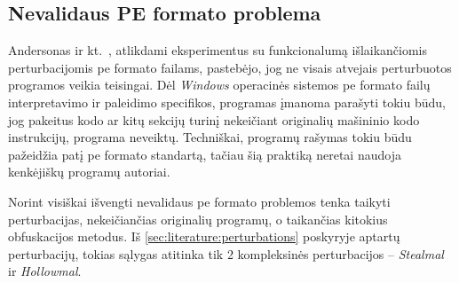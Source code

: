 \subsection{Nevalidaus PE formato problema}\label{sec:literature:pe_invalid}

Andersonas ir kt.~\cite{andersonLearningEvadeStatic2018}, atlikdami eksperimentus su funkcionalumą išlaikančiomis perturbacijomis \gls{pe} formato failams, pastebėjo, jog ne visais atvejais perturbuotos programos veikia teisingai. Dėl \textit{Windows} operacinės sistemos \gls{pe} formato failų interpretavimo ir paleidimo specifikos, programas įmanoma parašyti tokiu būdu, jog pakeitus kodo ar kitų sekcijų turinį nekeičiant originalių mašininio kodo instrukcijų, programa neveiktų. Techniškai, programų rašymas tokiu būdu pažeidžia patį \gls{pe} formato standartą, tačiau šią praktiką neretai naudoja kenkėjiškų programų autoriai.

Norint visiškai išvengti nevalidaus \gls{pe} formato problemos tenka taikyti perturbacijas, nekeičiančias originalių programų, o taikančias kitokius obfuskacijos metodus. Iš \ref{sec:literature:perturbations} poskyryje aptartų perturbacijų, tokias sąlygas atitinka tik 2 kompleksinės perturbacijos  -- \textit{Stealmal} ir \textit{Hollowmal}.